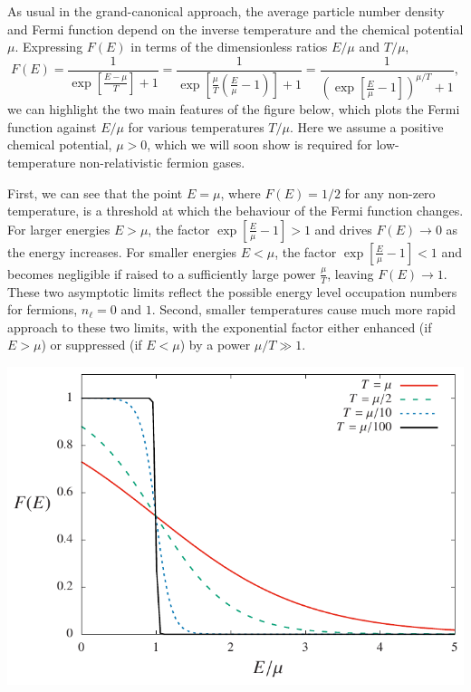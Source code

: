 As usual in the grand-canonical approach, the average particle number density and Fermi function depend on the inverse temperature \be and the chemical potential $\mu$.
Expressing $F(E)$ in terms of the dimensionless ratios $E / \mu$ and $T / \mu$,
\begin{equation*}
  F(E) = \frac{1}{\exp\left[\frac{E - \mu}{T}\right] + 1} = \frac{1}{\exp\left[\frac{\mu}{T}\left(\frac{E}{\mu} - 1\right)\right] + 1} = \frac{1}{\left(\exp\left[\frac{E}{\mu} - 1\right]\right)^{\mu / T} + 1},
\end{equation*}
we can highlight the two main features of the figure below, which plots the Fermi function against $E / \mu$ for various temperatures $T / \mu$.
Here we assume a positive chemical potential, $\mu > 0$, which we will soon show is required for low-temperature non-relativistic fermion gases.

First, we can see that the point $E = \mu$, where $F(E) = 1 / 2$ for any non-zero temperature, is a threshold at which the behaviour of the Fermi function changes.
For larger energies $E > \mu$, the factor $\exp\left[\frac{E}{\mu} - 1\right] > 1$ and drives $F(E) \to 0$ as the energy increases.
For smaller energies $E < \mu$, the factor $\exp\left[\frac{E}{\mu} - 1\right] < 1$ and becomes negligible if raised to a sufficiently large power $\frac{\mu}{T}$, leaving $F(E) \to 1$.
These two asymptotic limits reflect the possible energy level occupation numbers for fermions, $n_{\ell} = 0$ and $1$.
Second, smaller temperatures cause much more rapid approach to these two limits, with the exponential factor either enhanced (if $E > \mu$) or suppressed (if $E < \mu$) by a power $\mu / T \gg 1$.

\begin{center}\includegraphics[width=\textwidth]{figs/unit08_dist.pdf}\end{center}

